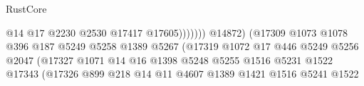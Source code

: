\begin{lexlean}{RustCore}
\begin{coremodule}
                                                              @14
                                                              @17
                                                              @2230
                                                              @2530
                                                              @17417
                                                              @17605)))))))
                                                @14872)
                                              (@17309
                                                @1073
                                                @1078
                                                @396
                                                @187
                                                @5249
                                                @5258
                                                @1389
                                                @5267
                                                (@17319
                                                  @1072
                                                  @17
                                                  @446
                                                  @5249
                                                  @5256
                                                  @2047
                                                  (@17327
                                                    @1071
                                                    @14
                                                    @16
                                                    @1398
                                                    @5248
                                                    @5255
                                                    @1516
                                                    @5231
                                                    @1522
                                                    @17343
                                                    (@17326
                                                      @899
                                                      @218
                                                      @14
                                                      @11
                                                      @4607
                                                      @1389
                                                      @1421
                                                      @1516
                                                      @5241
                                                      @1522

\end{coremodule}
\end{lexlean}
